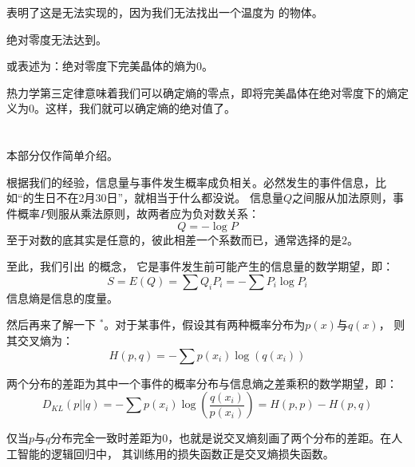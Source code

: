         表明了这是无法实现的，因为我们无法找出一个温度为  
        的物体。
        \begin{law}
            绝对零度无法达到。

            或表述为：绝对零度下完美晶体的熵为$0$。
        \end{law}
        热力学第三定律意味着我们可以确定熵的零点，即将完美晶体在绝对零度下的熵定义为$0$。这样，我们就可以确定熵的绝对值了。
    \section[信息]{}
        本部分仅作简单介绍。
        
        根据我们的经验，信息量与事件发生概率成负相关。必然发生的事件信息，比如``\dove 的生日不在2月30日''，就相当于什么都没说。
        信息量$Q$之间服从加法原则，事件概率$P$则服从乘法原则，故两者应为负对数关系：
        \begin{equation}
            Q = - \log P
            \nonumber
        \end{equation}
        至于对数的底其实是任意的，彼此相差一个系数而已，通常选择的是$2$。

        至此，我们引出  的概念，
        它是事件发生前可能产生的信息量的数学期望，即：
        \begin{equation}
            S = E(Q) = \sum Q_{i}P_{i} = -\sum P_{i}\log P_{i}
            \nonumber
        \end{equation}
        信息熵是信息的度量。

        然后再来了解一下 $^*$。对于某事件，假设其有两种概率分布为$p(x)$与$q(x)$，
        则其交叉熵为：
        \begin{equation}
            H(p,q) = - \sum p({x_{i}})\log(q({x_{i}}))
            \nonumber
        \end{equation}

        两个分布的差距为其中一个事件的概率分布与信息熵之差乘积的数学期望，即：
        \begin{equation}
            D_{KL}(p||q) = - \sum p({x_{i}})\log(\frac{q({x_{i}})}{p({x_{i}})}) = H(p,p)-H(p,q)
            \nonumber
        \end{equation} 

        仅当$p$与$q$分布完全一致时差距为$0$，也就是说交叉熵刻画了两个分布的差距。在人工智能的逻辑回归中，
        其训练用的损失函数正是交叉熵损失函数。

